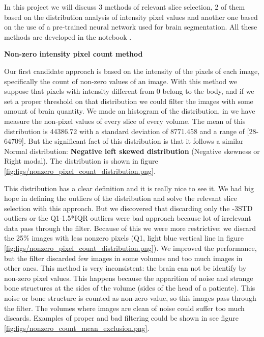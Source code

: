 In this project we will discuss 3 methods of relevant slice selection, 2 of them based on the distribution analysis of intensity pixel values and another one based on the use of a pre-trained neural network used for brain segmentation. All these methods are developed in the notebook .

\textbf{Non-zero intensity pixel count method}

Our first candidate approach is based on the intensity of the pixels of each image, specifically the count of non-zero values of an image. With this method we suppose that pixels with intensity different from 0 belong to the body, and if we set a proper threshold on that distribution we could filter the images with some amount of brain quantity. We made an histogram of the distribution, in we have measure the non-pixel values of every slice of every volume. The mean of this distribution is 44386.72 with a standard deviation of 8771.458 and a range of [28-64709]. But the significant fact of this distribution is that it follows a similar Normal distribution: \textbf{Negative left skewed distribution} (Negative skewness or Right modal). The distribution is shown in figure \ref{fig:figs/nonzero_pixel_count_distribution.png}. 


This distribution has a clear definition and it is really nice to see it. We had big hope in defining the outliers of the distribution and solve the relevant slice selection with this approach. But we discovered that discarding only the -3STD outliers or the Q1-1.5*IQR outliers were bad approach because lot of irrelevant data pass through the filter. Because of this we were more restrictive: we discard the 25\% images with less nonzero pixels (Q1, light blue vertical line in figure \ref{fig:figs/nonzero_pixel_count_distribution.png}). We improved the performance, but the filter discarded few images in some volumes and too much images in other ones. This method is very inconsistent: the brain can not be identify by non-zero pixel values. This happens because the apparition of noise and strange bone structures at the sides of the volume (sides of the head of a patiente). This noise or bone structure is counted as non-zero value, so this images pass through the filter. The volumes where images are clean of noise could suffer too much discards. Examples of proper and bad filtering could be shown in see figure \ref{fig:figs/nonzero_count_mean_exclusion.png}.

